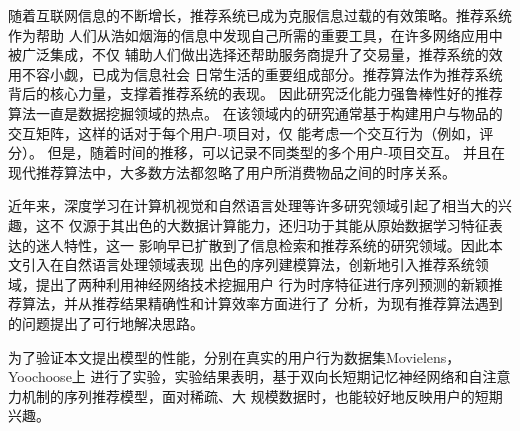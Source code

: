 ﻿%
\begin{cabstract}

    随着互联网信息的不断增长，推荐系统已成为克服信息过载的有效策略。推荐系统作为帮助%
    人们从浩如烟海的信息中发现自己所需的重要工具，在许多网络应用中被广泛集成，不仅%
    辅助人们做出选择还帮助服务商提升了交易量，推荐系统的效用不容小觑，已成为信息社会%
    日常生活的重要组成部分。推荐算法作为推荐系统背后的核心力量，支撑着推荐系统的表现。%
    因此研究泛化能力强鲁棒性好的推荐算法一直是数据挖掘领域的热点。
    在该领域内的研究通常基于构建用户与物品的交互矩阵，这样的话对于每个用户-项目对，仅%
    能考虑一个交互行为（例如，评分）。
    但是，随着时间的推移，可以记录不同类型的多个用户-项目交互。
    并且在现代推荐算法中，大多数方法都忽略了用户所消费物品之间的时序关系。

    近年来，深度学习在计算机视觉和自然语言处理等许多研究领域引起了相当大的兴趣，这不%
    仅源于其出色的大数据计算能力，还归功于其能从原始数据学习特征表达的迷人特性，这一%
    影响早已扩散到了信息检索和推荐系统的研究领域。因此本文引入在自然语言处理领域表现
    出色的序列建模算法，创新地引入推荐系统领域，提出了两种利用神经网络技术挖掘用户%
    行为时序特征进行序列预测的新颖推荐算法，并从推荐结果精确性和计算效率方面进行了%
    分析，为现有推荐算法遇到的问题提出了可行地解决思路。

    为了验证本文提出模型的性能，分别在真实的用户行为数据集Movielens，Yoochoose上%
    进行了实验，实验结果表明，基于双向长短期记忆神经网络和自注意力机制的序列推荐模型，面对稀疏、大%
    规模数据时，也能较好地反映用户的短期兴趣。

\end{cabstract}

\begin{eabstract}

\end{eabstract}

